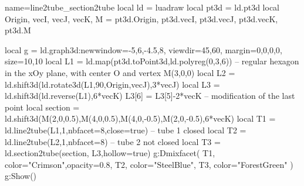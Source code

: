 \begin{luadraw}{name=line2tube_section2tube}
local ld = luadraw
local pt3d = ld.pt3d
local Origin, vecI, vecJ, vecK, M = pt3d.Origin, pt3d.vecI, pt3d.vecJ, pt3d.vecK, pt3d.M

local g = ld.graph3d:new{window={-5,6,-4.5,8}, viewdir={45,60}, margin={0,0,0,0}, size={10,10}}
local L1 = ld.map(pt3d.toPoint3d,ld.polyreg(0,3,6)) -- regular hexagon in the xOy plane, with center O and vertex M(3,0,0)
local L2 = ld.shift3d(ld.rotate3d(L1,90,{Origin,vecJ}),3*vecJ)
local L3 = ld.shift3d(ld.reverse(L1),6*vecK)
L3[6] = L3[5]-2*vecK -- modification of the last point
local section = ld.shift3d({M(2,0,0.5),M(4,0,0.5),M(4,0,-0.5),M(2,0,-0.5)},6*vecK)
local T1 = ld.line2tube(L1,1,{nbfacet=8,close=true}) -- tube 1 closed
local T2 = ld.line2tube(L2,1,{nbfacet=8}) -- tube 2 not closed
local T3 = ld.section2tube(section, L3,{hollow=true})
g:Dmixfacet( T1, {color="Crimson",opacity=0.8}, T2, {color="SteelBlue"}, T3, {color="ForestGreen"} )
g:Show()
\end{luadraw}
